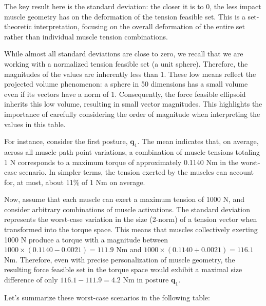 The key result here is the standard deviation: the closer it is to 0, the less impact muscle geometry has on the deformation of the tension feasible set. This is a set-theoretic interpretation, focusing on the overall deformation of the entire set rather than individual muscle tension combinations.

While almost all standard deviations are close to zero, we recall that we are working with a normalized tension feasible set (a unit sphere). Therefore, the magnitudes of the values are inherently less than 1. These low means reflect the projected volume phenomenon: a sphere in 50 dimensions has a small volume even if its vectors have a norm of 1. Consequently, the force feasible ellipsoid inherits this low volume, resulting in small vector magnitudes. This highlights the importance of carefully considering the order of magnitude when interpreting the values in this table.

For instance, consider the first posture, $\mathbf{q}_1$. The mean indicates that, on average, across all muscle path point variations, a combination of muscle tensions totaling 1 N corresponds to a maximum torque of approximately 0.1140 Nm in the worst-case scenario. In simpler terms, the tension exerted by the muscles can account for, at most, about 11\% of 1 Nm on average.

Now, assume that each muscle can exert a maximum tension of 1000 N, and consider arbitrary combinations of muscle activations. The standard deviation represents the worst-case variation in the size (2-norm) of a tension vector when transformed into the torque space. This means that muscles collectively exerting 1000 N produce a torque with a magnitude between $1000 \times (0.1140 - 0.0021) = 111.9$ Nm and $1000 \times (0.1140 + 0.0021) = 116.1$ Nm.  Therefore, even with precise personalization of muscle geometry, the resulting force feasible set in the torque space would exhibit a maximal size difference of only $116.1 - 111.9 = 4.2$ Nm in posture $\mathbf{q}_1$.

Let's summarize these worst-case scenarios in the following table:

